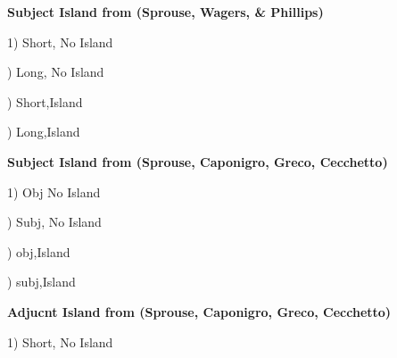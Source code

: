 \documentclass{article}
\begin{document}
\begin{center}
\textbf{Subject Island from  (Sprouse, Wagers, \& Phillips)}
\end{center}

1) Short, No Island

\begin{center}

\end{center}

) Long, No Island
\begin{center}

\end{center}

) Short,Island
\begin{center}

\end{center}

) Long,Island
\begin{center}

\end{center}

\newpage
\begin{center}
\textbf{Subject Island from (Sprouse, Caponigro, Greco, Cecchetto)}
\end{center}

1) Obj No Island

\begin{center}

\end{center}

) Subj, No Island
\begin{center}

\end{center}

) obj,Island
\begin{center}

\end{center}

) subj,Island
\begin{center}

\end{center}

\begin{center}
\textbf{Adjucnt Island from (Sprouse, Caponigro, Greco, Cecchetto)}
\end{center}

1) Short, No Island
\end{document}
